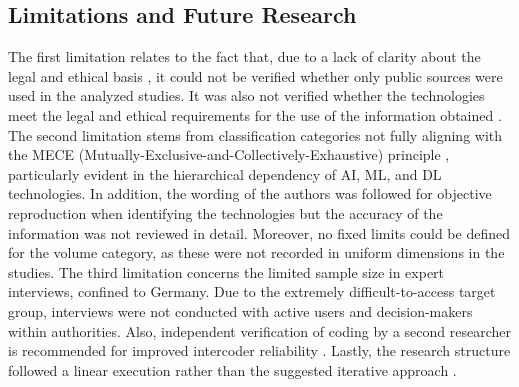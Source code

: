 \documentclass[10pt]{article}
\begin{document}
\subsection{Limitations and Future Research}

The first limitation relates to the fact that, due to a lack of clarity about the legal
and ethical basis \cite{Ghioni.2023,Wittmer.2022},
it could not be verified whether only public sources \cite{NorthAtlanticTreatyOrganization.2002} were used
in the analyzed studies. It was also not verified whether the technologies meet the
legal and ethical requirements for the use of the information obtained
\cite{PastorGalindo.2020,Wittmer.2022}. The second
limitation stems from classification categories not fully aligning with the
MECE (Mutually-Exclusive-and-Collectively-Exhaustive) principle \cite{Lee.2018},
particularly evident in the hierarchical dependency of AI, ML, and DL technologies. In addition,
the wording of the authors was followed for objective reproduction when identifying the technologies
but the accuracy of the information was not reviewed in detail. Moreover, no fixed limits could be defined
for the volume category, as these were not recorded in uniform dimensions in the studies.
The third limitation concerns the limited sample size in expert interviews, confined to Germany. Due to the
extremely difficult-to-access target group, interviews were not conducted with active users and decision-makers within authorities.
Also, independent verification of coding by a second researcher is recommended for improved intercoder reliability
\cite{Bogner.2002c, Glaser.2009}. Lastly, the research structure followed a linear execution rather than the suggested iterative approach \cite{Peffers.2007}.
\end{document}
